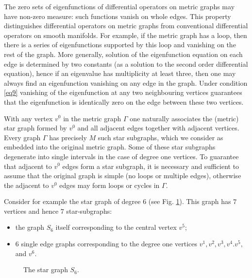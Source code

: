 \documentclass{amsart}
\theoremstyle{definition}
\theoremstyle{remark}
\numberwithin{equation}{section}
\begin{document}
The zero sets of eigenfunctions of differential operators on metric graphs may have non-zero measure:
such functions vanish on whole edges. This property distinguishes
differential operators on metric graphs from conventional differential operators on smooth manifolds. For example, if the metric graph has a loop,
then there is a series of eigenfunctions supported by this loop and vanishing on the rest of the graph.
More generally, solution of the eigenfunction equation on each edge is determined by two constants
(as a solution to the second order differential equation), hence if an eigenvalue has multiplicity at least three, then 
 one may always find an eigenfunction vanishing on any  edge in the graph. 
Under condition \eqref{eq9} vanishing of the eigenfunction at any two neighbouring vertices guarantees
that the eigenfunction is identically zero on the edge between these two vertices.

With any vertex $ v^0 $ in the metric graph $ \Gamma $ one naturally associates the (metric) star graph formed
by $ v^0 $ and all adjacent edges together with adjacent vertices. Every graph $ \Gamma $ has precisely $ M$
such star subgraphs, which we consider as embedded into the original metric graph. Some of these star subgraphs degenerate into 
single intervals in the case of degree one vertices.
To guarantee that adjacent to $ v^0$ edges form a star subgraph, it is necessary and sufficient to assume 
that the original graph is simple (no loops or multiple edges), otherwise the adjacent to $ v^0$ edges may form loops or cycles in $ \Gamma$.


Consider for example the star graph of degree $6$ (see Fig. \ref{FigStar}). This graph has $7$ vertices and hence $7$ star-subgraphs: 
\begin{itemize}
\item the graph $ S_6 $ itself corresponding to the central vertex $ v^5$;
\item $6$ single edge graphs corresponding to the degree one vertices $ v^1, v^2, v^3, v^4. v^5, $ and $v^6$.
\end{itemize}

\begin{figure}[ht]
\centering
{}
\caption{The star graph $ S_6$.}
\label{FigStar}
\end{figure}
\vspace{-2mm}
\end{document}
